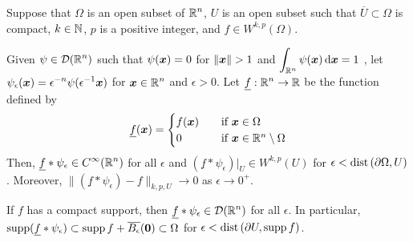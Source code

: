 \begin{lemma} \label{sob_denselem2}
Suppose that $\Omega$ is an open subset of $\displaystyle \mathbb{R}^n$,
$U$ is an open subset such that $\overline{U} \subset \Omega$ is
compact, $k\in \mathbb{N}$, $p$ is a positive integer, and
$\displaystyle f \in W^{k,p}(\Omega)$.

Given $\displaystyle \psi \in \mathcal{D}(\mathbb{R}^n)$ such that
$\psi({\bm{x}}) = 0$ for $\|\VEC{x}\|>1$ and
$\displaystyle \int_{\mathbb{R}^n} \psi({\bm{x}})\,\mathrm{d}{{\bm{x}}} = 1$ \footnotemark, let
$\displaystyle \psi_\epsilon({\bm{x}}) = \epsilon^{-n} \psi(\epsilon^{-1}{\bm{x}})$
for $\displaystyle {\bm{x}} \in \mathbb{R}^n$ and $\epsilon > 0$.
Let $\displaystyle \underline{f}:\mathbb{R}^n \to \mathbb{R}$ be the function defined by
\[
\underline{f}({\bm{x}}) =
\begin{cases}
f({\bm{x}}) & \quad \text{if} \ {\bm{x}} \in \Omega \\
0 & \quad \text{if} \ {\bm{x}} \in \mathbb{R}^n \setminus \Omega
\end{cases}
\]
Then, $\displaystyle \underline{f} \ast \psi_{\epsilon} \in C^\infty(\mathbb{R}^n)$
for all $\epsilon$
and $\displaystyle \left(\underline{f} \ast \psi_{\epsilon}\right)\big|_U \in
W^{k,p}(U)$ for $\epsilon < \mathrm{dist}\left(\partial \Omega,U\right)$.  Moreover,
$\| \left( \underline{f} \ast \psi_{\epsilon} \right)
- f\|_{k,p,U} \rightarrow 0$ as $\epsilon \rightarrow 0^+$.

If $f$ has a compact support, then
$\displaystyle \underline{f} \ast \psi_{\epsilon} \in \mathcal{D}(\mathbb{R}^n)$ for
all $\epsilon$.  In particular, $\displaystyle \operatorname{supp} (\underline{f} \ast
\psi_{\epsilon}) \subset \operatorname{supp} f + \overline{B_\epsilon}({\bm{0}})
\subset \Omega$ for $\epsilon < \mathrm{dist}\left(\partial U,\operatorname{supp} f\right)$.
\end{lemma}


